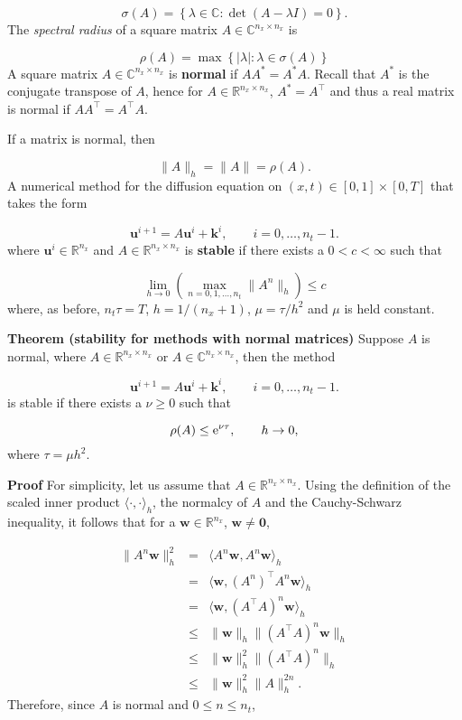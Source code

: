 \documentclass[12pt,landscape]{article}
\begin{document}
{\[
\sigma(A) = \left\lbrace \lambda \in \mathbb{C} : \det(A - \lambda I)= 0  \right\rbrace.
\]
The \emph{spectral radius} of a square matrix $A \in \mathbb{C}^{n_x \times n_x}$ is

\[
\rho(A) = \max\left\lbrace \vert \lambda \vert : \lambda \in \sigma(A)\right\rbrace
\]
A square matrix $A \in \mathbb{C}^{n_x \times n_x}$ is \textbf{normal} if $AA^{*} = A^{*}A$.  Recall that $A^*$ is the conjugate transpose of $A$, hence for  $A \in \mathbb{R}^{n_x \times n_x}$, $A^{*} = A^{\top}$ and thus a real matrix is normal if $AA^{\top} = A^{\top}A$.

If a matrix is normal, then

\[
\| A \|_h =\| A \| = \rho(A).
\]
A numerical method for the diffusion equation on $(x,t)\in [0, 1]\times[0, T]$ that takes the form

\[
\mathbf{u}^{i+1} = A\mathbf{u}^i + \mathbf{k}^i, \qquad i = 0, \ldots, n_t-1.
\]
where $\mathbf{u}^i \in \mathbb{R}^{n_x}$ and $A \in \mathbb{R}^{n_x \times n_x}$ is \textbf{stable} if there exists a $0 < c < \infty$ such that

\[
\lim_{h \to 0}\left( \max_{n = 0, 1, \ldots, n_t} \| A^n \|_h  \right) \leq c
\]
where, as before, $n_t\tau = T$, $h = 1/(n_x + 1)$, $\mu = \tau/h^2$ and $\mu$ is held constant.

\textbf{Theorem (stability for methods with normal matrices)} Suppose $A$ is normal, where $A \in \mathbb{R}^{n_x \times n_x}$ or $A \in \mathbb{C}^{n_x \times n_x}$,  then the method 

\[
\mathbf{u}^{i+1} = A\mathbf{u}^i + \mathbf{k}^i, \qquad i = 0, \ldots, n_t-1.
\]
is stable if there exists a $\nu \geq 0$ such that

\[
\rho(A) \leq {\rm e}^{\nu \tau}, \qquad h \to 0,
\]
where $\tau = \mu h^2$. 

\textbf{Proof}  For simplicity, let us assume that $A \in \mathbb{R}^{n_x \times n_x}$.  Using the definition of the scaled inner product $\langle \cdot, \cdot \rangle_h$, the normalcy of $A$ and the Cauchy-Schwarz inequality, it follows that for a $\mathbf{w} \in \mathbb{R}^{n_x}$, $\mathbf{w} \neq \mathbf{0}$,


\begin{eqnarray*}
\| A^n \mathbf{w} \|_h^2 &=& \langle A^n\mathbf{w}, A^n\mathbf{w}\rangle_h \\
&=& \langle \mathbf{w},  \left(A^n\right)^{\top}A^n\mathbf{w}\rangle_h \\
&=&  \langle \mathbf{w},  \left(A^{\top}A\right)^n\mathbf{w}\rangle_h \\ 
&\leq & \|  \mathbf{w}\|_h \|\left(A^{\top}A\right)^n\mathbf{w}\|_h \\
&\leq & \|  \mathbf{w}\|_h^2 \|\left(A^{\top}A\right)^n\|_h \\
&\leq & \|  \mathbf{w}\|_h^2 \|A\|_h^{2n}.
\end{eqnarray*}
Therefore, since $A$ is normal and $0 \leq  n \leq n_t$,

}
\end{document}
